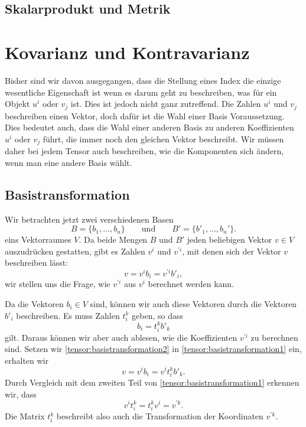 \subsection{Skalarprodukt und Metrik}

\section{Kovarianz und Kontravarianz}
Bisher sind wir davon ausgegangen, dass die Stellung eines Index die
einzige wesentliche Eigenschaft ist wenn es darum geht zu beschreiben,
was für ein Objekt $u^i$ oder $v_j$ ist.
Dies ist jedoch nicht ganz zutreffend.
Die Zahlen $u^i$ und $v_j$ beschreiben einen Vektor, doch dafür ist
die Wahl einer Basis Voraussetzung.
Dies bedeutet auch, dass die Wahl einer anderen Basis zu anderen
Koeffizienten $u^i$ oder $v_j$ führt, die immer noch den gleichen
Vektor beschreibt.
Wir müssen daher bei jedem Tensor auch beschreiben, wie die Komponenten
sich ändern, wenn man eine andere Basis wählt.

\subsection{Basistransformation}
Wir betrachten jetzt zwei verschiedenen Basen
\[
B=\{b_1,\dots,b_n\}
\qquad\text{und}\qquad
B'=\{b'_1,\dots,b_n'\}.
\]
eins Vektorraumes $V$.
Da beide Mengen $B$ und $B'$ jeden beliebigen Vektor $v\in V$ auszudrücken
gestatten, gibt es Zahlen $v^i$ und $v^{\prime i}$, mit denen sich der Vektor
$v$ beschreiben lässt:
\begin{equation}
v = v^ib_i = v^{\prime i}b'_i,
\label{tensor:basistransformation1}
\end{equation}
wir stellen uns die Frage, wie $v^{\prime i}$ aus $v^i$ berechnet
werden kann.

Da die Vektoren $b_i\in V$ sind, können wir auch diese Vektoren durch
die Vektoren $b'_i$ beschreiben.
Es muss Zahlen $t^k_i$ geben, so dass
\begin{equation}
b_i = t_i^k b'_k
\label{tensor:basistransformation2}
\end{equation}
gilt.
Daraus können wir aber auch ablesen, wie die Koeffizienten $v^{\prime i}$
zu berechnen sind.
Setzen wir \eqref{tensor:basistransformation2} in
\eqref{tensor:basistransformation1} ein, erhalten wir
\begin{equation}
v = v^i b_i = v^i t_i^kb'_k.
\end{equation}
Durch Vergleich mit dem zweiten Teil von \eqref{tensor:basistransformation1}
erkennen wir, dass 
\begin{equation}
v^i t_i^k
=
t_i^k v^i
=
v^{\prime k}.
\label{tensor:basistransformation3}
\end{equation}
Die Matrix $t_i^k$ beschreibt also auch die Transformation der Koordinaten
$v^{\prime k}$.


